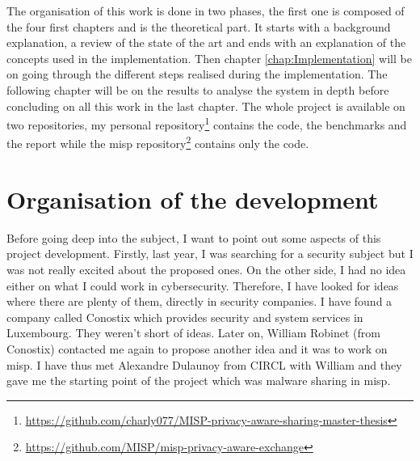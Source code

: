 \documentclass{eplmastersthesis}
\begin{document}
The organisation of this work is done in two phases, the first one is composed of the four first chapters and is the theoretical part. It starts with a background explanation, a review of the state of the art and ends with an explanation of the concepts used in the implementation. Then chapter \ref{chap:Implementation} will be on going through the different steps realised during the implementation. The following chapter will be on the results to analyse the system in depth before concluding on all this work in the last chapter. The whole project is available on two repositories, my personal repository\footnote{\url{https://github.com/charly077/MISP-privacy-aware-sharing-master-thesis}} contains the code, the benchmarks and the report while the \gls{misp} repository\footnote{\url{https://github.com/MISP/misp-privacy-aware-exchange}} contains only the code.

\section{Organisation of the development}
Before going deep into the subject, I want to point out some aspects of this project development.
Firstly, last year, I was searching for a security subject but I was not really excited about the proposed ones. On the other side, I had no idea either on what I could work in cybersecurity. Therefore, I have looked for ideas where there are plenty of them, directly in security companies.
I have found a company called Conostix which provides security and system services in Luxembourg.
They weren't short of ideas. Later on, William Robinet (from Conostix) contacted me again to propose another idea and it was to work on \gls{misp}. I have thus met Alexandre Dulaunoy from CIRCL with William and they gave me the starting point of the project which was malware sharing in \gls{misp}.\\
\end{document}
